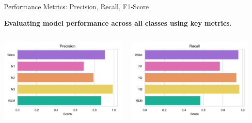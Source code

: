 \begin{frame}{Performance Metrics: Precision, Recall, F1-Score}

    \centering
    \textbf{Evaluating model performance across all classes using key metrics.}
    
    \vspace{10pt} %

    \begin{columns}
        \centering
        \includegraphics[width=\linewidth]{images/paper_3/precision_plot.png} %

        \centering
        \includegraphics[width=\linewidth]{images/paper_3/recall_plot.png} %


\end{columns}
\end{frame}
